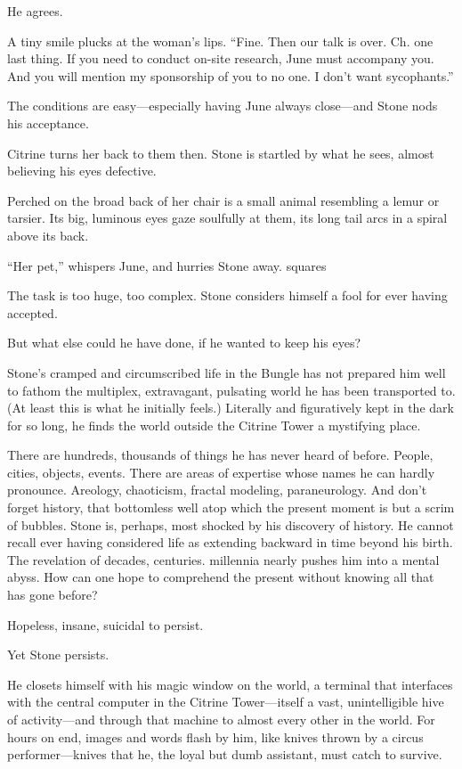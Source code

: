 He agrees.

A tiny smile plucks at the woman’s lips. “Fine. Then our talk is over. Ch. one last thing. If you need to conduct on-site research, June must accompany you. And you will mention my sponsorship of you to no one. I don’t want sycophants.”

The conditions are easy—especially having June always close—and Stone nods his acceptance.

Citrine turns her back to them then. Stone is startled by what he sees, almost believing his eyes defective.

Perched on the broad back of her chair is a small animal resembling a lemur or tarsier. Its big, luminous eyes gaze soulfully at them, its long tail arcs in a spiral above its back.

“Her pet,” whispers June, and hurries Stone away.
squares

The task is too huge, too complex. Stone considers himself a fool for ever having accepted.

But what else could he have done, if he wanted to keep his eyes?

Stone’s cramped and circumscribed life in the Bungle has not prepared him well to fathom the multiplex, extravagant, pulsating world he has been transported to. (At least this is what he initially feels.) Literally and figuratively kept in the dark for so long, he finds the world outside the Citrine Tower a mystifying place.

There are hundreds, thousands of things he has never heard of before. People, cities, objects, events. There are areas of expertise whose names he can hardly pronounce. Areology, chaoticism, fractal modeling, paraneurology. And don’t forget history, that bottomless well atop which the present moment is but a scrim of bubbles. Stone is, perhaps, most shocked by his discovery of history. He cannot recall ever having considered life as extending backward in time beyond his birth. The revelation of decades, centuries. millennia nearly pushes him into a mental abyss. How can one hope to comprehend the present without knowing all that has gone before?

Hopeless, insane, suicidal to persist.

Yet Stone persists.

He closets himself with his magic window on the world, a terminal that interfaces with the central computer in the Citrine Tower—itself a vast, unintelligible hive of activity—and through that machine to almost every other in the world. For hours on end, images and words flash by him, like knives thrown by a circus performer—knives that he, the loyal but dumb assistant, must catch to survive.

